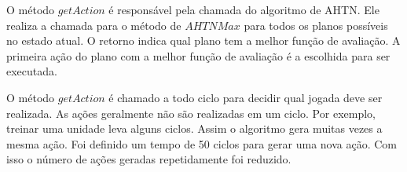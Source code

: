  
O método $\mathit{getAction}$ é responsável pela chamada do algoritmo de AHTN. 
Ele realiza a chamada para o método de $\mathit{AHTNMax}$ para todos os planos possíveis no estado atual.
O retorno indica qual plano tem a melhor função de avaliação.
A primeira ação do plano com a melhor função de avaliação é a escolhida para ser executada. 

O método $\mathit{getAction}$ é chamado a todo ciclo para decidir qual jogada deve ser realizada.
As ações geralmente não são realizadas em um ciclo.
Por exemplo, treinar uma unidade leva alguns ciclos.
Assim o algoritmo gera muitas vezes a mesma ação.
Foi definido um tempo de 50 ciclos para gerar uma nova ação.
Com isso o número de ações geradas repetidamente foi reduzido.

